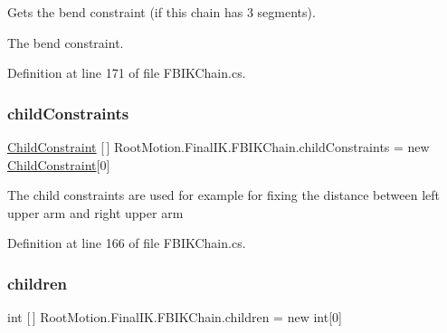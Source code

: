 Gets the bend constraint (if this chain has 3 segments). 

The bend constraint.

Definition at line 171 of file F\+B\+I\+K\+Chain.\+cs.

\mbox{\label{class_root_motion_1_1_final_i_k_1_1_f_b_i_k_chain_ac7a843d4a4b2cd31b37afadc399ade6a}} 
\subsubsection{\texorpdfstring{child\+Constraints}{childConstraints}}
{\footnotesize\ttfamily \mbox{\hyperlink{class_root_motion_1_1_final_i_k_1_1_f_b_i_k_chain_1_1_child_constraint}{Child\+Constraint}} \mbox{[}$\,$\mbox{]} Root\+Motion.\+Final\+I\+K.\+F\+B\+I\+K\+Chain.\+child\+Constraints = new \mbox{\hyperlink{class_root_motion_1_1_final_i_k_1_1_f_b_i_k_chain_1_1_child_constraint}{Child\+Constraint}}\mbox{[}0\mbox{]}}



The child constraints are used for example for fixing the distance between left upper arm and right upper arm 



Definition at line 166 of file F\+B\+I\+K\+Chain.\+cs.

\mbox{\label{class_root_motion_1_1_final_i_k_1_1_f_b_i_k_chain_a0cc59ce9014a189e49f332a963b912b9}} 
\subsubsection{\texorpdfstring{children}{children}}
{\footnotesize\ttfamily int \mbox{[}$\,$\mbox{]} Root\+Motion.\+Final\+I\+K.\+F\+B\+I\+K\+Chain.\+children = new int\mbox{[}0\mbox{]}}




